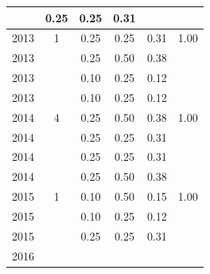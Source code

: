 \begin{table}[H]
\begin{tabular}{| l | c | c | c | c | c |}
          &
          0.25
          &
          0.25
          &
          0.31
          &
          \\
\hline
            2013
          &
          1
          &
          0.25
          &
          0.25
          &
          0.31
          &
            {\color{blue} 1.00}
          \\
            2013
          &
          
          &
          0.25
          &
          0.50
          &
          0.38
          &
          \\
            2013
          &
          
          &
          0.10
          &
          0.25
          &
          0.12
          &
          \\
            2013
          &
          
          &
          0.10
          &
          0.25
          &
          0.12
          &
          \\
\hline
            2014
          &
          4
          &
          0.25
          &
          0.50
          &
          0.38
          &
            {\color{blue} 1.00}
          \\
            2014
          &
          
          &
          0.25
          &
          0.25
          &
          0.31
          &
          \\
            2014
          &
          
          &
          0.25
          &
          0.25
          &
          0.31
          &
          \\
            2014
          &
          
          &
          0.25
          &
          0.50
          &
          0.38
          &
          \\
\hline
            2015
          &
          1
          &
          0.10
          &
          0.50
          &
          0.15
          &
            {\color{blue} 1.00}
          \\
            2015
          &
          
          &
          0.10
          &
          0.25
          &
          0.12
          &
          \\
            2015
          &
          
          &
          0.25
          &
          0.25
          &
          0.31
          &
          \\
\hline
            2016
          &
          

\end{tabular}
\end{table}
